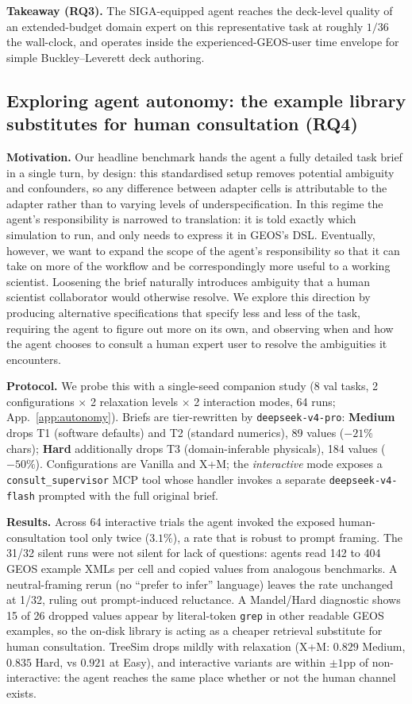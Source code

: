 \documentclass{article}
\begin{document}
\textbf{Takeaway (RQ3).} The SIGA-equipped agent reaches the deck-level quality of an extended-budget domain expert on this representative task at roughly $1/36$ the wall-clock, and operates inside the experienced-GEOS-user time envelope for simple Buckley--Leverett deck authoring.

\subsection{Exploring agent autonomy: the example library substitutes for human consultation (RQ4)}
\label{subsec:autonomy}

\textbf{Motivation.} Our headline benchmark hands the agent a fully detailed task brief in a single turn, by design: this standardised setup removes potential ambiguity and confounders, so any difference between adapter cells is attributable to the adapter rather than to varying levels of underspecification. In this regime the agent's responsibility is narrowed to translation: it is told exactly which simulation to run, and only needs to express it in GEOS's DSL. Eventually, however, we want to expand the scope of the agent's responsibility so that it can take on more of the workflow and be correspondingly more useful to a working scientist. Loosening the brief naturally introduces ambiguity that a human scientist collaborator would otherwise resolve. We explore this direction by producing alternative specifications that specify less and less of the task, requiring the agent to figure out more on its own, and observing when and how the agent chooses to consult a human expert user to resolve the ambiguities it encounters.

\textbf{Protocol.} We probe this with a single-seed companion study (8 val tasks, 2 configurations $\times$ 2 relaxation levels $\times$ 2 interaction modes, 64 runs; App.~\ref{app:autonomy}). Briefs are tier-rewritten by \texttt{deepseek-v4-pro}: \textbf{Medium} drops T1 (software defaults) and T2 (standard numerics), 89 values ($-21\%$ chars); \textbf{Hard} additionally drops T3 (domain-inferable physicals), 184 values ($-50\%$). Configurations are Vanilla and X+M; the \emph{interactive} mode exposes a \texttt{consult\_supervisor} MCP tool whose handler invokes a separate \texttt{deepseek-v4-flash} prompted with the full original brief.

\textbf{Results.} Across 64 interactive trials the agent invoked the exposed human-consultation tool only twice ($3.1\%$), a rate that is robust to prompt framing. The 31/32 silent runs were not silent for lack of questions: agents read 142 to 404 GEOS example XMLs per cell and copied values from analogous benchmarks. A neutral-framing rerun (no ``prefer to infer'' language) leaves the rate unchanged at 1/32, ruling out prompt-induced reluctance. A Mandel/Hard diagnostic shows 15 of 26 dropped values appear by literal-token \texttt{grep} in other readable GEOS examples, so the on-disk library is acting as a cheaper retrieval substitute for human consultation. TreeSim drops mildly with relaxation (X+M: $0.829$ Medium, $0.835$ Hard, vs $0.921$ at Easy), and interactive variants are within $\pm 1$pp of non-interactive: the agent reaches the same place whether or not the human channel exists.
\end{document}
